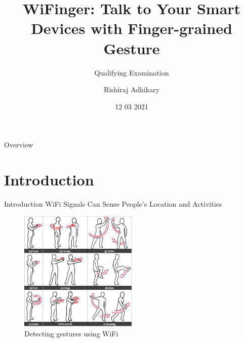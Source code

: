 \documentclass{beamer}
\title{WiFinger: Talk to Your Smart Devices with Finger-grained Gesture}
\subtitle{Qualifying Examination}
\author{Rishiraj Adhikary}
\institute{Computer Science and Engineering \\ IIT Gandhinagar}
\date{12 03 2021}
\begin{document}

\begin{frame}
	\maketitle %
\end{frame}

\begin{frame}{Overview}
\tableofcontents
\end{frame}


\section{Introduction} %


\begin{frame}{Introduction}
WiFi Signals Can Sense People's Location and Activities
	\begin{center}
		\begin{figure}
			\includegraphics[width=0.5\textwidth]{Images/wiaction.png}
			\caption{Detecting gestures using WiFi~\cite{pu2013whole}}
		\end{figure}
     \end{center}
\end{frame}
\end{document}
